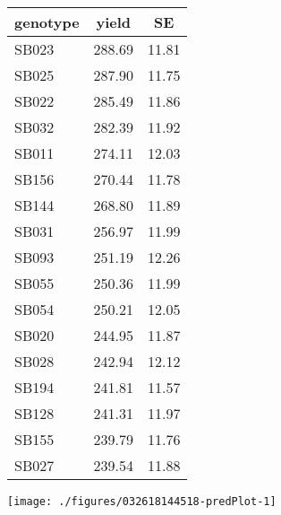 \documentclass[a4paper,11pt]{article}\usepackage[]{graphicx}\usepackage[]{color}
\newenvironment{knitrout}{}{} %
\begin{document}
\begin{multicols*}{2}
\begin{tabular}{lcc}
  \hline
genotype & yield & SE \\ 
  \hline
SB023 & 288.69 & 11.81 \\ 
  SB025 & 287.90 & 11.75 \\ 
  SB022 & 285.49 & 11.86 \\ 
  SB032 & 282.39 & 11.92 \\ 
  SB011 & 274.11 & 12.03 \\ 
  SB156 & 270.44 & 11.78 \\ 
  SB144 & 268.80 & 11.89 \\ 
  SB031 & 256.97 & 11.99 \\ 
  SB093 & 251.19 & 12.26 \\ 
  SB055 & 250.36 & 11.99 \\ 
  SB054 & 250.21 & 12.05 \\ 
  SB020 & 244.95 & 11.87 \\ 
  SB028 & 242.94 & 12.12 \\ 
  SB194 & 241.81 & 11.57 \\ 
  SB128 & 241.31 & 11.97 \\ 
  SB155 & 239.79 & 11.76 \\ 
  SB027 & 239.54 & 11.88 \\ 
   \hline
\end{tabular}

\columnbreak
\begin{knitrout}
\color{fgcolor}
\texttt{[image: ./figures/032618144518-predPlot-1]} 

\end{knitrout}
\end{multicols*}
\end{document}
